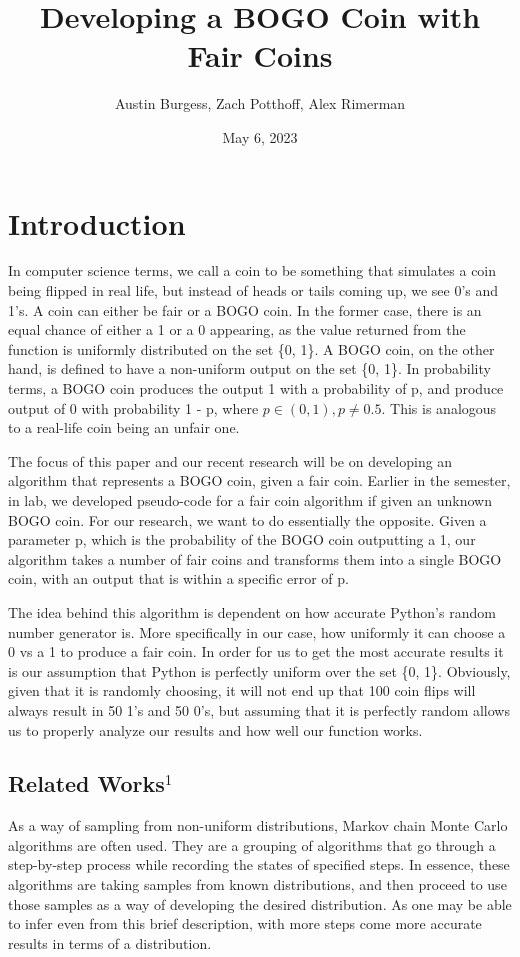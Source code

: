 \documentclass[11pt]{article}
\title{Developing a BOGO Coin with Fair Coins}
\author{Austin Burgess, Zach Potthoff, Alex Rimerman}
\date{May 6, 2023}
\begin{document}
\maketitle

\section*{Introduction}

\quad In computer science terms, we call a coin to be something that simulates a coin being flipped in 
real life, but instead of heads or tails coming up, we see 0's and 1's. A coin can either be fair 
or a BOGO coin. In the former case, there is an equal chance of either a 1 or a 0 appearing, as 
the value returned from the function is uniformly distributed on the set \{0, 1\}. A BOGO coin, 
on the other hand, is defined to have a non-uniform output on the set \{0, 1\}. In probability terms,
a BOGO coin produces the output 1 with a probability of p, and produce output of 0 with
probability 1 - p, where $p\in(0, 1), p\neq0.5$. This is analogous to a real-life coin being an unfair one. 

The focus of this paper and our recent research will be on developing an algorithm that represents 
a BOGO coin, given a fair coin. Earlier in the semester, in lab, we developed pseudo-code for a 
fair coin algorithm if given an unknown BOGO coin. For our research, we want to do essentially the 
opposite. Given a parameter p, which is the probability of the BOGO coin outputting a 1, our 
algorithm takes a number of fair coins and transforms them into a single BOGO coin, with an output 
that is within a specific error of p. 

The idea behind this algorithm is dependent on how accurate Python's random number generator is.
More specifically in our case, how uniformly it can choose a 0 vs a 1 to produce a fair coin.
In order for us to get the most accurate results it is our assumption that Python is perfectly uniform
over the set \{0, 1\}. Obviously, given that it is randomly choosing, it will not end up that
100 coin flips will always result in 50 1's and 50 0's, but assuming that it is perfectly random allows
us to properly analyze our results and how well our function works.


\subsection*{Related Works$^1$}

\quad As a way of sampling from non-uniform distributions, Markov chain Monte Carlo algorithms 
are often used. They are a grouping of algorithms that go through a step-by-step process while 
recording the states of specified steps. In essence, these algorithms are taking samples from 
known distributions, and then proceed to use those samples as a way of developing the desired 
distribution. As one may be able to infer even from this brief description, with more steps come 
more accurate results in terms of a distribution.
\end{document}
